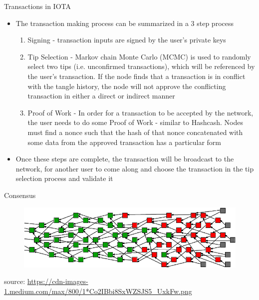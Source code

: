 \documentclass[10pt]{beamer}
\begin{document}
\begin{frame}{Transactions in IOTA}
	\begin{itemize}
		\item The transaction making process can be summarized in a 3 step process
		\begin{enumerate}
			\item Signing - transaction inputs are signed by the user's private keys
			\item Tip Selection - Markov chain Monte Carlo (MCMC) is used to randomly select two tips (i.e. unconfirmed transactions), which will be referenced by the user's transaction. If the node finds that a transaction is in conflict with the tangle history, the node will not approve the conflicting transaction in either a direct or indirect manner
			\item Proof of Work - In order for a transaction to be accepted by the network, the user needs to do some Proof of Work - similar to Hashcash. Nodes must find a nonce such that the hash of that nonce concatenated with some data from the approved transaction has a particular form
		\end{enumerate}
		\item Once these steps are complete, the transaction will be broadcast to the network, for another user to come along and choose the transaction in the tip selection process and validate it
	\end{itemize}
\end{frame}


\begin{frame}{Consensus}
	\begin{figure}[]
		\centering
		\includegraphics  [scale=0.3]{Images/iota-consensus}
	\end{figure}
	\begin{scriptsize}
		source: \href{https://blog.iota.org/a-primer-on-iota-with-presentation-e0a6eb2cc621}{https://cdn-images-1.medium.com/max/800/1*Co2IBbi8SxWZSJS5\_UxkFw.png}
	\end{scriptsize}
\end{frame}
\end{document}
